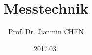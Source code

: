 \documentclass[english,ngerman]{beamer}
\newcommand\makebeamertitle{\frame{\maketitle}}%
\begin{document}
\title{Messtechnik }


\author{Prof. Dr. Jianmin CHEN}




\date{}


\date[SS17]{2017.03.}

\makebeamertitle
\end{document}
